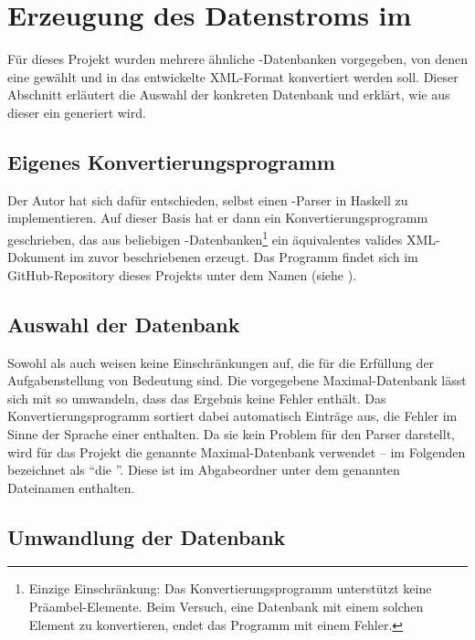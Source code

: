 \section{Erzeugung des Datenstroms im \BibTeXXMLformat}

Für dieses Projekt wurden mehrere ähnliche \mbox{\BibTeX-}Datenbanken
vorgegeben, von denen eine gewählt und in das entwickelte XML-Format konvertiert
werden soll. Dieser Abschnitt erläutert die Auswahl der konkreten Datenbank und
erklärt, wie aus dieser ein \BibTeXXMLdoc{} generiert wird.

\subsection{Eigenes Konvertierungsprogramm}

\def\temp{%
    Einzige Einschränkung: Das Konvertierungsprogramm unterstützt keine
    Präambel-Elemente. Beim Versuch, eine Datenbank mit einem solchen Element zu
    konvertieren, endet das Programm mit einem Fehler.%
}

Der Autor hat sich dafür entschieden, selbst einen \mbox{\BibTeX-}Parser in
Haskell zu implementieren. Auf dieser Basis hat er dann ein
Konvertierungsprogramm geschrieben, das aus beliebigen
\mbox{\BibTeX-}Datenbanken\footnote{\temp} ein äquivalentes valides XML-Dokument
im zuvor beschriebenen \BibTeXXMLformat{} erzeugt. Das Programm findet sich im
GitHub-Repository dieses Projekts unter dem Namen  (siehe
\cite{github-bibtex-xml}).

\subsection{Auswahl der Datenbank}

Sowohl \BibTeXXML{} als auch  weisen keine Einschränkungen auf,
die für die Erfüllung der Aufgabenstellung von Bedeutung sind. Die vorgegebene
Maximal-Datenbank  lässt sich mit
 so umwandeln, dass das Ergebnis keine Fehler enthält. Das
Konvertierungsprogramm sortiert dabei automatisch Einträge aus, die Fehler im
Sinne der Sprache einer \BibTeXdatabase{} enthalten. Da sie kein Problem für den
Parser darstellt, wird für das Projekt die genannte Maximal-Datenbank verwendet
-- im Folgenden bezeichnet als \enquote{die \BibTeXdatabase}. Diese ist im
Abgabeordner unter dem genannten Dateinamen enthalten.

\subsection{Umwandlung der Datenbank}

